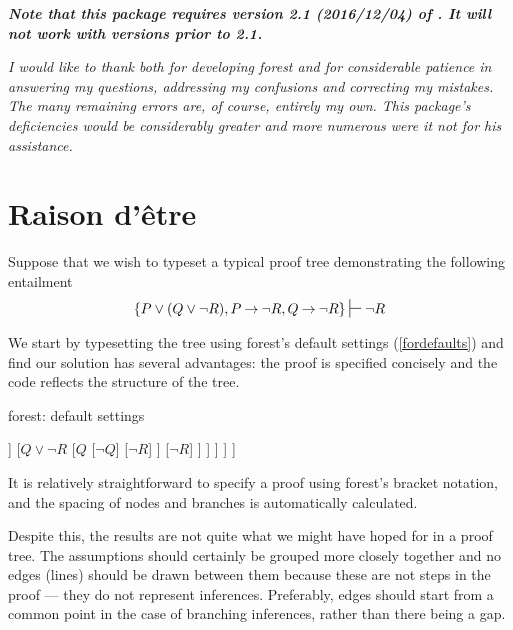 \documentclass[10pt,british,a4paper]{ltxdoc}
\newcommand*\pkg[1]{\textsf{#1}}
\newcommand*{\lif}{\ensuremath{\mathbin{\rightarrow}}}
\begin{document}
\emph{\bfseries Note that this package requires version 2.1 (2016/12/04) of \keyname[pkg]{\pkg{forest}} \autocite{saso-forest-manual}.
  It will not work with versions prior to 2.1.}
\bigskip

\emph{I would like to thank \citeauthor{saso-forest-manual} both for developing \pkg{forest} and for considerable patience in answering my questions, addressing my confusions and correcting my mistakes.
The many remaining errors are, of course, entirely my own.
This package's deficiencies would be considerably greater and more numerous were it not for his assistance.}


\clearpage

\tableofcontents

\section{Raison d'être}\label{sec:raisondetre}

Suppose that we wish to typeset a typical proof tree demonstrating the following entailment
\[
  \{P \vee (Q \vee \lnot R), P \lif \lnot R, Q \lif \lnot R\} \sststile{}{} \lnot R
\]

We start by typesetting the tree using \pkg{forest}'s default settings (\cref{fordefaults}) and find our solution has several advantages: the proof is specified concisely and the code reflects the structure of the tree.
\begin{codcoeden}[label=fordefaults,floatplacement=bp!]{\pkg{forest}: default settings}
\begin{forest}
  [$P \vee (Q \vee \lnot R)$
    [$P \lif \lnot R$
      [$Q \lif \lnot R$
        [$\lnot\lnot R$
          [$P$
            [$\lnot P$]
            [$\lnot R$]
          ]
          [$Q \vee \lnot R$
            [$Q$
              [$\lnot Q$]
              [$\lnot R$]
            ]
            [$\lnot R$]
          ]
        ]
      ]
    ]
  ]
\end{forest}
\end{codcoeden}
It is relatively straightforward to specify a proof using \pkg{forest}'s bracket notation, and the spacing of nodes and branches is automatically calculated.

Despite this, the results are not quite what we might have hoped for in a proof tree.
The assumptions should certainly be grouped more closely together and no edges (lines) should be drawn between them because these are not steps in the proof --- they do not represent inferences.
Preferably, edges should start from a common point in the case of branching inferences, rather than there being a gap.
\end{document}
